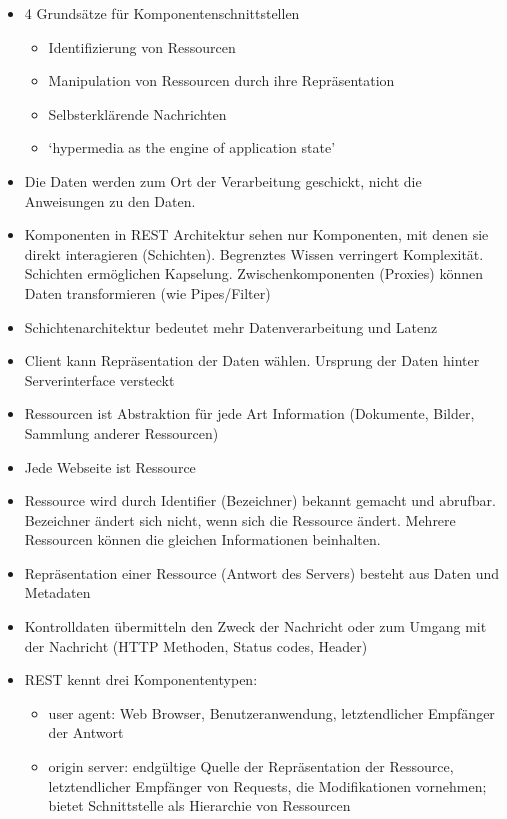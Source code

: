 \begin{itemize}
  \item 4 Grundsätze für Komponentenschnittstellen
  \begin{itemize}
    \item Identifizierung von Ressourcen
    \item Manipulation von Ressourcen durch ihre Repräsentation
    \item Selbsterklärende Nachrichten
    \item `hypermedia as the engine of application state'
  \end{itemize}
  \item Die Daten werden zum Ort der Verarbeitung geschickt, nicht die Anweisungen zu den Daten.
  \item Komponenten in REST Architektur sehen nur Komponenten, mit denen sie direkt interagieren (Schichten). Begrenztes Wissen verringert Komplexität. Schichten ermöglichen Kapselung. Zwischenkomponenten (Proxies) können Daten transformieren (wie Pipes/Filter)
  \item Schichtenarchitektur bedeutet mehr Datenverarbeitung und Latenz
  \item Client kann Repräsentation der Daten wählen. Ursprung der Daten hinter Serverinterface versteckt
  \item Ressourcen ist Abstraktion für jede Art Information (Dokumente, Bilder, Sammlung anderer Ressourcen)
  \item Jede Webseite ist Ressource
  \item Ressource wird durch Identifier (Bezeichner) bekannt gemacht und abrufbar. Bezeichner ändert sich nicht, wenn sich die Ressource ändert. Mehrere Ressourcen können die gleichen Informationen beinhalten.
  \item Repräsentation einer Ressource (Antwort des Servers) besteht aus Daten und Metadaten
  \item Kontrolldaten übermitteln den Zweck der Nachricht oder zum Umgang mit der Nachricht (HTTP Methoden, Status codes, Header)
  \item REST kennt drei Komponententypen:
  \begin{itemize}
    \item user agent: Web Browser, Benutzeranwendung, letztendlicher Empfänger der Antwort
    \item origin server: endgültige Quelle der Repräsentation der Ressource, letztendlicher Empfänger von Requests, die Modifikationen vornehmen; bietet Schnittstelle als Hierarchie von Ressourcen

\end{itemize}
\end{itemize}
